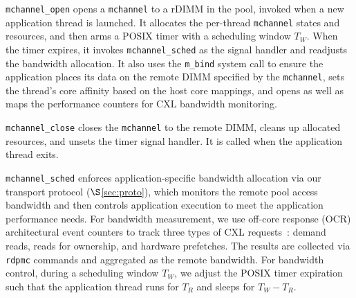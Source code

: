 \item \texttt{mchannel\_open} opens a \texttt{mchannel} to a rDIMM in the pool, invoked when a new application thread is launched. It allocates the per-thread \texttt{mchannel} states and resources, and then arms a POSIX timer with a scheduling window $T_W$. When the timer expires, it invokes \texttt{mchannel\_sched} as the signal handler and readjusts the bandwidth allocation.
It also uses the \texttt{m\_bind} system call to ensure the application places its data on the remote DIMM specified by the \texttt{mchannel}, sets the thread’s core affinity based on the host core mappings, and opens as well as maps the performance counters for CXL bandwidth monitoring.

\item \texttt{mchannel\_close} closes the \texttt{mchannel} to the remote DIMM, cleans up allocated resources, and unsets the timer signal handler.  It is called when the application thread exits.

\item \texttt{mchannel\_sched} enforces application-specific bandwidth allocation via our transport protocol ($\S$\ref{sec:proto}), which monitors the remote pool access bandwidth and then controls application execution to meet the application performance needs.
For bandwidth measurement, we use off-core response (OCR) architectural event counters to track three types of CXL requests~\cite{pathfinder-sigcomm25, melody-asplos25}: demand reads, reads for ownership, and hardware prefetches. The results are collected via \texttt{rdpmc} commands and aggregated as the remote bandwidth. For bandwidth control, during a scheduling window $T_W$, we adjust the POSIX timer expiration such that the application thread runs for $T_R$ and sleeps for $T_W - T_R$.


\squishend

